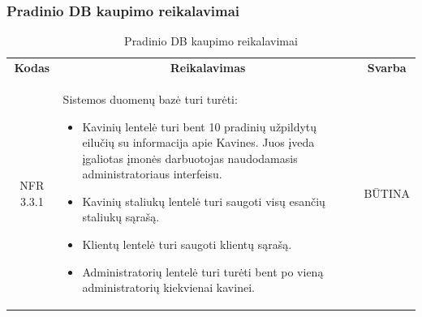 \documentclass{VUMIFPSkursinis}
\begin{document}
\subsubsection{Pradinio DB kaupimo reikalavimai}
\begin{center}
	\begin{table}[H]
	\caption{Pradinio DB kaupimo reikalavimai}
	\begin{tabular}{|p{2cm}|p{}|p{}|}
	\hline
	    \rowcolor{lightgray}
		\multicolumn{3}{|c|}{Pradinio DB kaupimo reikalavimai}\\
		
	\hline
		\multicolumn{1}{|c|}{{\bfseries Kodas}}&
		\multicolumn{1}{|c|}{{\bfseries Reikalavimas}}&
		\multicolumn{1}{|c|}{{\bfseries Svarba}}\\
	\hline 	
		\multicolumn{1}{|c|}{NFR 3.3.1}&
		{Sistemos duomenų bazė turi turėti:
			\begin{itemize}
				\item Kavinių lentelė turi bent 10 pradinių užpildytų eilučių su informacija apie Kavines. Juos įveda įgaliotas įmonės darbuotojas naudodamasis administratoriaus interfeisu.
				\item Kavinių staliukų lentelė turi saugoti visų esančių staliukų sąrašą.
				\item Klientų lentelė turi saugoti klientų sąrašą.
				\item Administratorių lentelė turi turėti bent po vieną administratorių kiekvienai kavinei.
			\end{itemize}}&
		\multicolumn{1}{|c|}{BŪTINA}\\	
	
	\hline 	
	
	\end{tabular}
	\end{table}

\end{center}
\end{document}
